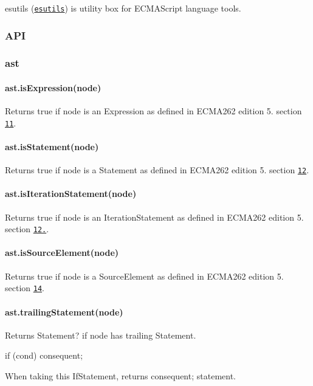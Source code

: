 esutils (\href{http://github.com/estools/esutils}{\tt esutils}) is utility box for E\+C\+M\+A\+Script language tools.

\subsubsection*{A\+P\+I}

\subsubsection*{ast}

\paragraph*{ast.\+is\+Expression(node)}

Returns true if {\ttfamily node} is an Expression as defined in E\+C\+M\+A262 edition 5. section \href{https://es5.github.io/#x11}{\tt 11}.

\paragraph*{ast.\+is\+Statement(node)}

Returns true if {\ttfamily node} is a Statement as defined in E\+C\+M\+A262 edition 5. section \href{https://es5.github.io/#x12}{\tt 12}.

\paragraph*{ast.\+is\+Iteration\+Statement(node)}

Returns true if {\ttfamily node} is an Iteration\+Statement as defined in E\+C\+M\+A262 edition 5. section \href{https://es5.github.io/#x12.6}{\tt 12.}.

\paragraph*{ast.\+is\+Source\+Element(node)}

Returns true if {\ttfamily node} is a Source\+Element as defined in E\+C\+M\+A262 edition 5. section \href{https://es5.github.io/#x14}{\tt 14}.

\paragraph*{ast.\+trailing\+Statement(node)}

Returns {\ttfamily Statement?} if {\ttfamily node} has trailing {\ttfamily Statement}. 
\begin{DoxyCode}
\textcolor{keywordflow}{if} (cond)
    consequent;
\end{DoxyCode}
 When taking this {\ttfamily If\+Statement}, returns {\ttfamily consequent;} statement.

